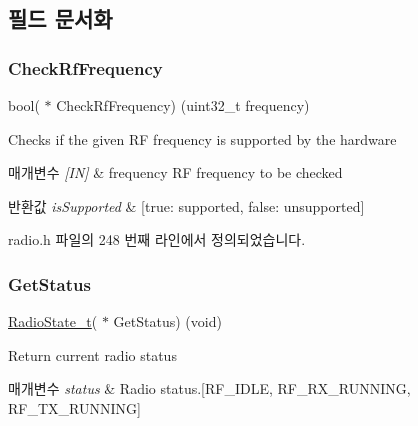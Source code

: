 \subsection{필드 문서화}
\mbox{\label{struct_radio__s_a984f224d5ef26fb8a35f77d664f384df}} 
\subsubsection{\texorpdfstring{Check\+Rf\+Frequency}{CheckRfFrequency}}
{\footnotesize\ttfamily bool( $\ast$ Check\+Rf\+Frequency) (uint32\+\_\+t frequency)}



Checks if the given RF frequency is supported by the hardware 


\begin{DoxyParams}{매개변수}
{\em \mbox{[}\+I\+N\mbox{]}} & frequency RF frequency to be checked \\
\hline
\end{DoxyParams}

\begin{DoxyRetVals}{반환값}
{\em is\+Supported} & \mbox{[}true\+: supported, false\+: unsupported\mbox{]} \\
\hline
\end{DoxyRetVals}


radio.\+h 파일의 248 번째 라인에서 정의되었습니다.

\mbox{\label{struct_radio__s_a8d469520cd62ec3004a50fcaa31d8c72}} 
\subsubsection{\texorpdfstring{Get\+Status}{GetStatus}}
{\footnotesize\ttfamily \mbox{\hyperlink{radio_8h_a2f3fa4ad0237c4ace94aa99086aac9f5}{Radio\+State\+\_\+t}}( $\ast$ Get\+Status) (void)}

Return current radio status


\begin{DoxyParams}{매개변수}
{\em status} & Radio status.\mbox{[}R\+F\+\_\+\+I\+D\+LE, R\+F\+\_\+\+R\+X\+\_\+\+R\+U\+N\+N\+I\+NG, R\+F\+\_\+\+T\+X\+\_\+\+R\+U\+N\+N\+I\+NG\mbox{]} \\
\hline
\end{DoxyParams}


